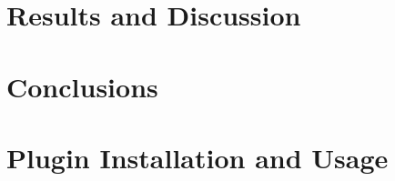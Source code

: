 \documentclass[standard]{styles/thesis}
\begin{document}
\chapter{Results and Discussion}
\label{chap_results}
\minitoc
\newpage


\chapter{Conclusions}
\label{chap_conclusions}
\newpage


\appendix
\chapter{Plugin Installation and Usage}
\label{appendix_a}








\begin{figure}
\begin{center}
\Automaton
\end{center}
\end{figure}

\begin{figure}
\begin{center}
\RunTree
\end{center}
\end{figure}

\begin{figure}
\begin{center}
\SubsetConstructionTree
\end{center}
\end{figure}

\begin{figure}
\begin{center}
\SplitTreeRightLeft
\end{center}
\end{figure}

\begin{figure}
\begin{center}
\ReducedSplitTreeRightLeft
\end{center}
\end{figure}

\begin{figure}
\begin{center}
\RunDAG
\end{center}
\end{figure} 
\end{document}
